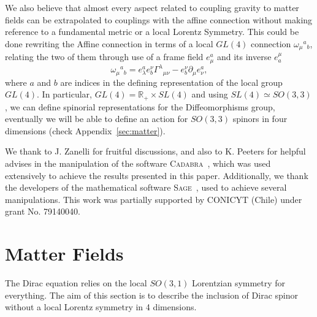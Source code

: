 \documentclass[twocolumn,aps,
  showpacs,showkeys,prd,superscriptaddress]{revtex4-1}
\begin{document}
We also believe that almost every aspect related to coupling gravity to matter fields can be extrapolated to couplings with the affine connection without making reference to a fundamental metric or a local Lorentz Symmetry. This could be  done rewriting the Affine connection in terms of a local $GL(4)$ connection
$\omega_{\mu}{}^a{}_b$, relating the two of them through use of a frame field $e_\mu^a$ and its inverse $e^\mu_a$
\begin{equation}
  \omega_{\mu}{}^a{}_b = e_\lambda^a e_b^\nu \Gamma^{\lambda}{}_{\mu\nu} -  e_b^\nu\partial_{\mu}e_\nu^a,
\end{equation} where $a$ and $b$ are indices in the defining representation of the local group $GL(4)$.
 In particular, \mbox{$GL(4) = \mathbb{R}_+ \times SL(4)$} and using \mbox{$SL(4) \simeq SO(3,3)$,} we can define spinorial representations for the Diffeomorphisms group, eventually we will be able to define an action for $SO(3,3)$ spinors in four dimensions (check Appendix~\ref{sec:matter}).


\begin{acknowledgments}
  We thank to J. Zanelli for fruitful discussions, and also to K. Peeters for helpful advises in the manipulation of the software \textsc{Cadabra}~\cite{Peeters:2007wn,*peeters2007symbolic,*Peeters2007550}, which was used extensively to achieve the results presented in this paper. Additionally, we thank the developers of the mathematical software \textsc{Sage}~\cite{sage}, used to achieve several manipulations. This work was partially supported by CONICYT (Chile) under grant No. 79140040.
\end{acknowledgments}


\appendix

\section{\label{sec:matter} Matter Fields}

The Dirac equation relies on the local $SO(3,1)$ Lorentzian symmetry for everything. The aim of this section is to describe the inclusion of Dirac spinor without a local Lorentz symmetry in 4 dimensions. 
\end{document}
